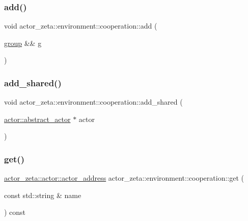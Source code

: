 \subsubsection{\texorpdfstring{add()}{add()}}
{\footnotesize\ttfamily void actor\+\_\+zeta\+::environment\+::cooperation\+::add (\begin{DoxyParamCaption}\item[{\hyperlink{classactor__zeta_1_1environment_1_1group}{group} \&\&}]{g }\end{DoxyParamCaption})}

\mbox{\label{classactor__zeta_1_1environment_1_1cooperation_ae56bc9d52dda51010fccad4cdff10548}} 
\subsubsection{\texorpdfstring{add\+\_\+shared()}{add\_shared()}}
{\footnotesize\ttfamily void actor\+\_\+zeta\+::environment\+::cooperation\+::add\+\_\+shared (\begin{DoxyParamCaption}\item[{\hyperlink{classactor__zeta_1_1actor_1_1abstract__actor}{actor\+::abstract\+\_\+actor} $\ast$}]{actor }\end{DoxyParamCaption})}

\mbox{\label{classactor__zeta_1_1environment_1_1cooperation_a4e377910758dabfeb504e3fa228cdcd2}} 
\subsubsection{\texorpdfstring{get()}{get()}}
{\footnotesize\ttfamily \hyperlink{classactor__zeta_1_1actor_1_1actor__address}{actor\+\_\+zeta\+::actor\+::actor\+\_\+address} actor\+\_\+zeta\+::environment\+::cooperation\+::get (\begin{DoxyParamCaption}\item[{const std\+::string \&}]{name }\end{DoxyParamCaption}) const}

